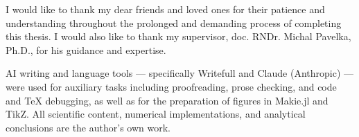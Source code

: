 \documentclass[../main.tex]{subfiles}
\begin{document}
\cleardoublepage
{}

\vspace*{-2ex}
{ \slshape

I would like to thank my dear friends and loved ones for their patience and understanding throughout the prolonged and demanding process of completing this thesis. I would also like to thank my supervisor, doc. RNDr. Michal Pavelka, Ph.D., for his guidance and expertise.

    \begin{flushright}
        \sffamily\large
        \ThesisAuthor
    \end{flushright}
}
\vspace{15cm}
AI writing and language tools — specifically Writefull and Claude (Anthropic) — were used for auxiliary tasks including proofreading, prose checking, and code and TeX debugging, as well as for the preparation of figures in Makie.jl and TikZ. All scientific content, numerical implementations, and analytical conclusions are the author's own work.



\vfill
\end{document}
